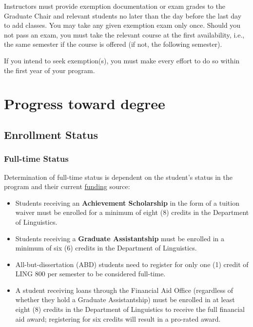 \documentclass[
]{book}
\begin{document}
Instructors must provide exemption documentation or exam grades to the Graduate Chair and relevant students no later than the day before the last day to add classes. You may take any given exemption exam only once. Should you not pass an exam, you must take the relevant course at the first availability, i.e., the same semester if the course is offered (if not, the following semester).

If you intend to seek exemption(s), you must make every effort to do so within the first year of your program.

\chapter{Progress toward degree}\label{progress-toward-degree}

\section{Enrollment Status}\label{enrollment-status}

\subsection{Full-time Status}\label{full-time-status}

Determination of full-time status is dependent on the student's status in the program and their current \hyperref[funding]{funding} source:

\begin{itemize}
\item
  Students receiving an \textbf{Achievement Scholarship} in the form of a tuition waiver must be enrolled for a minimum of eight (8) credits in the Department of Linguistics.
\item
  Students receiving a \textbf{Graduate Assistantship} must be enrolled in a minimum of six (6) credits in the Department of Linguistics.
\item
  All-but-dissertation (ABD) students need to register for only one (1) credit of LING 800 per semester to be considered full-time.
\item
  A student receiving loans through the Financial Aid Office (regardless of whether they hold a Graduate Assistantship) must be enrolled in at least eight (8) credits in the Department of Linguistics to receive the full financial aid award; registering for six credits will result in a pro-rated award.
\end{itemize}
\end{document}
